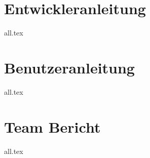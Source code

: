 














\tableofcontents




\texttt{}
\begin{lstlisting}[language=bash, keywords={}]
\end{lstlisting}
\begin{lstlisting}[language={[x86masm]Assembler}]
\end{lstlisting}

\chapter{Entwickleranleitung}
{all.tex}

\chapter{Benutzeranleitung}
{all.tex}

\chapter{Team Bericht}
{all.tex}



